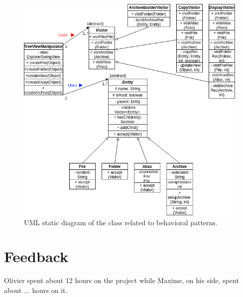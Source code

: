 \documentclass[a4paper, 11pt, oneside]{article}
\begin{document}
\begin{figure}[H]
    \centering
    \includegraphics[scale=0.6]{behavioral.png}
    \caption{UML static diagram of the class related to behavioral patterns.}\label{fig:behavioral}
\end{figure}

\section{Feedback}

Olivier spent about 12 hours on the project while Maxime, on his side, spent about ... hours on it.
\end{document}
